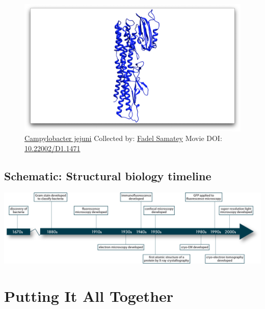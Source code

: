 \documentclass[]{tufte-book}
\begin{document}
\begin{figure}
\includegraphics{movie_stills/1_9} \caption[\protect\hyperlink{tree}{Campylobacter jejuni} Collected by:
\protect\hyperlink{fadel_samatey}{Fadel Samatey} Movie DOI:
\href{https://doi.org/10.22002/D1.1471}{10.22002/D1.1471}]{\protect\hyperlink{tree}{Campylobacter jejuni} Collected by:
\protect\hyperlink{fadel_samatey}{Fadel Samatey} Movie DOI:
\href{https://doi.org/10.22002/D1.1471}{10.22002/D1.1471}}\label{fig:1-9}
\end{figure}

\hypertarget{Structural_biology_timeline}{\subsection*{Schematic:
Structural biology timeline}\label{Structural_biology_timeline}}

\includegraphics{img/schematics/1_9_1}

\section{Putting It All Together}\label{putting-it-all-together}
\end{document}
